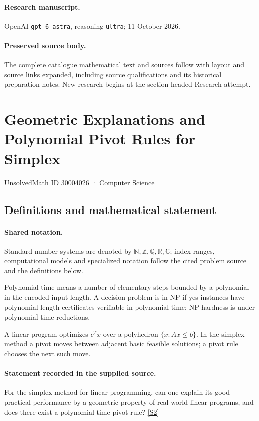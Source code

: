 \documentclass[11pt]{article}
\begin{document}
\paragraph{Research manuscript.} OpenAI \texttt{gpt-6-astra}, reasoning \texttt{ultra}; 11 October 2026.
\paragraph{Preserved source body.} The complete catalogue mathematical text and sources follow with layout and source links expanded, including source qualifications and its historical preparation notes. New research begins at the section headed Research attempt.

\section{Geometric Explanations and Polynomial Pivot Rules for Simplex}\label{30004026}
{\small UnsolvedMath ID 30004026 · Computer Science}
\subsection{Definitions and mathematical statement}

\paragraph{Shared notation.}Standard number systems are denoted by $\mathbb N,\mathbb Z,\mathbb Q,\mathbb R,\mathbb C$; index ranges, computational models and specialized notation follow the cited problem source and the definitions below.


Polynomial time means a number of elementary steps bounded by a polynomial in the encoded input length. A decision problem is in $\mathrm{NP}$ if yes-instances have polynomial-length certificates verifiable in polynomial time; NP-hardness is under polynomial-time reductions.

A linear program optimizes $c^Tx$ over a polyhedron $\{x:Ax\leq b\}$. In the simplex method a pivot moves between adjacent basic feasible solutions; a pivot rule chooses the next such move.
\paragraph{Statement recorded in the supplied source.}
For the simplex method for linear programming, can one explain its good practical performance by a geometric property of real-world linear programs, and does there exist a polynomial-time pivot rule? \href{https://doi.org/10.4171/owr/2018/54}{[S2]}
\end{document}
